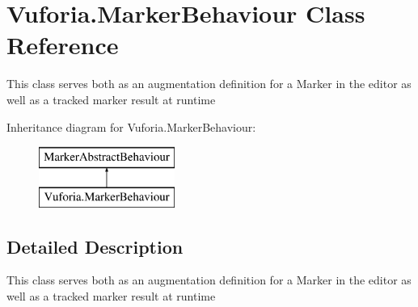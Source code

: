 \hypertarget{class_vuforia_1_1_marker_behaviour}{}\section{Vuforia.\+Marker\+Behaviour Class Reference}
\label{class_vuforia_1_1_marker_behaviour}


This class serves both as an augmentation definition for a Marker in the editor as well as a tracked marker result at runtime  


Inheritance diagram for Vuforia.\+Marker\+Behaviour\+:\begin{figure}[H]
\begin{center}
\leavevmode
\includegraphics[height=2.000000cm]{class_vuforia_1_1_marker_behaviour}
\end{center}
\end{figure}


\subsection{Detailed Description}
This class serves both as an augmentation definition for a Marker in the editor as well as a tracked marker result at runtime 


